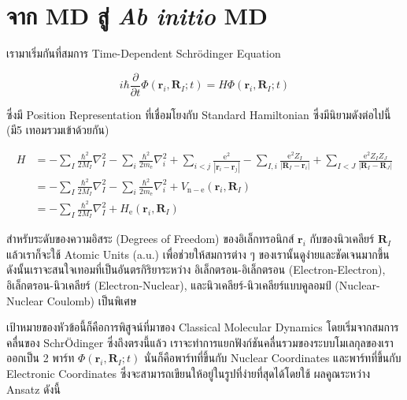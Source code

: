 \section{จาก MD สู่ \textit{Ab initio} MD}

เรามาเริ่มกันที่สมการ Time-Dependent Schr\"{o}dinger Equation

\begin{equation}
  \label{eq:AIMD_TDSE}
  i \hbar \frac{\partial}{\partial t} \Phi\left(\mathbf{r}_i,\mathbf{R}_I ; t\right)
  =
  H \Phi\left(\mathbf{r}_i,\mathbf{R}_I ; t\right)
\end{equation}

\noindent ซึ่งมี Position Representation ที่เชื่อมโยงกับ Standard Hamiltonian ซึ่งมีนิยามดังต่อไปนี้ (มี5 เทอมรวมเข้าด้วยกัน)

\begin{equation}
  \label{eq:AIMD_Hamiltonian}
  \begin{aligned}
    H
     & = -\sum_I \frac{\hbar^2}{2 M_I} \nabla_I^2
    -\sum_i \frac{\hbar^2}{2 m_{\mathrm{e}}} \nabla_i^2
    +\sum_{i<j} \frac{\mathrm{e}^2}{\left|\mathbf{r}_i-\mathbf{r}_j\right|}
    -\sum_{I, i} \frac{\mathrm{e}^2 Z_I}{\left|\mathbf{R}_I-\mathbf{r}_i\right|}
    +\sum_{I<J} \frac{\mathrm{e}^2 Z_I Z_J}{\left|\mathbf{R}_I-\mathbf{R}_J\right|} \\
     & = -\sum_I \frac{\hbar^2}{2 M_I} \nabla_I^2
    -\sum_i \frac{\hbar^2}{2 m_{\mathrm{e}}} \nabla_i^2
    +V_{\mathrm{n}-\mathrm{e}}\left(\mathbf{r}_i,\mathbf{R}_I\right)                \\
     & = -\sum_I \frac{\hbar^2}{2 M_I} \nabla_I^2
    +H_{\mathrm{e}}\left(\mathbf{r}_i,\mathbf{R}_I\right)
  \end{aligned}
\end{equation}

\noindent สำหรับระดับของความอิสระ (Degrees of Freedom) ของอิเล็กทรอนิกส์ $\mathbf{r}_i$ กับของนิวเคลียร์ $\mathbf{R}_I$
แล้วเราก็จะใช้ Atomic Units (a.u.) เพื่อช่วยให้สมการต่าง ๆ ของเรานั้นดูง่ายและชัดเจนมากขึ้น ดังนั้นเราจะสนใจเทอมที่เป็นอันตรกิริยาระหว่าง
อิเล็กตรอน-อิเล็กตรอน (Electron-Electron), อิเล็กตรอน-นิวเคลียร์ (Electron-Nuclear), และนิวเคลียร์-นิวเคลียร์แบบคูลอมป์
(Nuclear-Nuclear Coulomb) เป็นพิเศษ

เป้าหมายของหัวข้อนี้ก็คือการพิสูจน์ที่มาของ Classical Molecular Dynamics โดยเริ่มจากสมการคลื่นของ Schr\"{O}dinger ซึ่งถึงตรงนี้แล้ว
เราจะทำการแยกฟังก์ชันคลื่นรวมของระบบโมเลกุลของเราออกเป็น 2 พาร์ท $\Phi\left(\mathbf{r}_i,\mathbf{R}_I ; t\right)$
นั่นก็คือพาร์ทที่ขึ้นกับ Nuclear Coordinates และพาร์ทที่ขึ้นกับ Electronic Coordinates ซึ่งจะสามารถเขียนให้อยู่ในรูปที่ง่ายที่สุดได้โดยใช้
ผลคูณระหว่าง Ansatz ดังนี้

